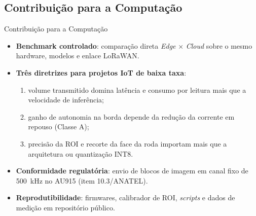 \documentclass[
    aspectratio=169,
    11pt,
    brazil
]{beamer}
\begin{document}
\subsection{Contribuição para a Computação}
\begin{frame}{Contribuição para a Computação}
  \begin{itemize}\scriptsize
    \setlength{\itemsep}{4pt}
    \item \textbf{Benchmark controlado}: comparação direta \textit{Edge} $\times$ \textit{Cloud} sobre o mesmo hardware, modelos e enlace LoRaWAN.
    \item \textbf{Três diretrizes para projetos IoT de baixa taxa}:
      \begin{enumerate}\scriptsize
        \item volume transmitido domina latência e consumo por leitura mais que a velocidade de inferência;
        \item ganho de autonomia na borda depende da redução da corrente em repouso (Classe A);
        \item precisão da ROI e recorte da face da roda importam mais que a arquitetura ou quantização INT8.
      \end{enumerate}
    \item \textbf{Conformidade regulatória}: envio de blocos de imagem em canal fixo de 500~kHz no AU915 (item 10.3/ANATEL).
    \item \textbf{Reprodutibilidade}: firmwares, calibrador de ROI, \textit{scripts} e dados de medição em repositório público.
  \end{itemize}
\end{frame}
\end{document}
